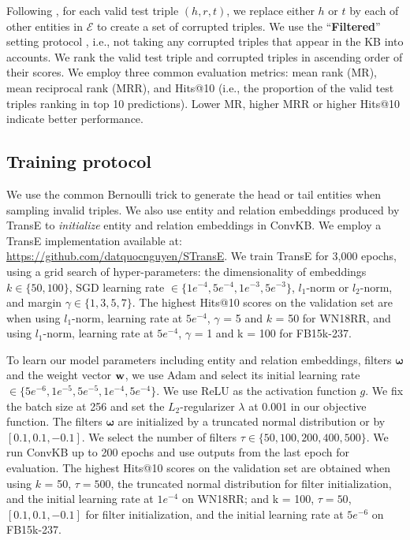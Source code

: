\documentclass[11pt,a4paper]{article}
\begin{document}
Following \citet{NIPS2013_5071}, for each valid test triple $(h, r, t)$, we replace either $h$ or $t$ by each of other entities in $\mathcal{E}$ to create a set of corrupted triples.
We use the ``\textbf{Filtered}'' setting protocol \citep{NIPS2013_5071}, i.e., not taking  any corrupted triples that appear in the KB into accounts.
We rank the valid test triple and corrupted triples in ascending order of their scores.
We employ three common evaluation metrics: mean rank (MR), mean reciprocal rank (MRR), and Hits@10 (i.e., the proportion of the valid test triples ranking in top 10 predictions). 
Lower MR, higher MRR or higher Hits@10 indicate better  performance.

\subsection{Training protocol}
We use the common Bernoulli trick \citep{AAAI148531,AAAI159571} to generate the head or tail entities when sampling invalid triples. We also use entity and relation embeddings produced by TransE to \textit{initialize} entity and relation embeddings in ConvKB. We employ a  TransE implementation available at: \url{https://github.com/datquocnguyen/STransE}.  
We train TransE  for 3,000 epochs,
 using a grid search of hyper-parameters: the dimensionality of embeddings $k \in \{50, 100\}$, SGD learning rate $\in \{1e^{-4}, 5e^{-4}, 1e^{-3}, 5e^{-3}\}$, $\mathit{l}_1$-norm or $\mathit{l}_2$-norm, and margin $\gamma \in \{1, 3, 5, 7\}$. 
The highest Hits@10 scores  on the validation set are when using $\mathit{l}_1$-norm, learning rate at $5e^{-4}$, $\gamma$ = 5 and $k$ = 50 for WN18RR, and using $\mathit{l}_1$-norm, learning rate at $5e^{-4}$,  $\gamma$ = 1 and k = 100 for FB15k-237.

To learn our model parameters including entity and relation embeddings, filters $\boldsymbol{\omega}$ and the weight vector $\bold{w}$, we use  Adam \citep{kingma2014adam}  and select its initial learning rate $\in \{5e^{-6}, 1e^{-5}, 5e^{-5}, 1e^{-4}, 5e^{-4}\}$. We use ReLU as the activation function $g$. 
We fix the batch size at 256 and set  the $L_2$-regularizer $\lambda$ at 0.001 in our objective function.
The filters $\boldsymbol{\omega}$ are initialized by a truncated normal distribution or by $[0.1, 0.1, -0.1]$.
We select the number of filters $\tau \in \{50, 100, 200, 400, 500\}$.
We run ConvKB up to 200 epochs and use  outputs from the last epoch for evaluation. 
The highest Hits@10 scores on the validation set are obtained when using $k$ = 50, $\tau = 500$, the truncated normal distribution for filter initialization, 
and the initial learning rate at $1e^{-4}$ on WN18RR; and k = 100, $\tau = 50$, $[0.1, 0.1, -0.1]$ for filter initialization, and the initial learning rate at $5e^{-6}$ on FB15k-237. 
\end{document}
